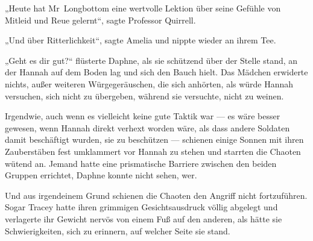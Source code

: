 \later

„Heute hat Mr~Longbottom eine wertvolle Lektion über seine Gefühle von Mitleid und Reue gelernt“, sagte Professor Quirrell.

„Und über Ritterlichkeit“, sagte Amelia und nippte wieder an ihrem Tee.

\later

„Geht es dir gut?“ flüsterte Daphne, als sie schützend über der Stelle stand, an der Hannah auf dem Boden lag und sich den Bauch hielt. Das Mädchen erwiderte nichts, außer weiteren Würgegeräuschen, die sich anhörten, als würde Hannah versuchen, sich nicht zu übergeben, während sie versuchte, nicht zu weinen.

Irgendwie, auch wenn es vielleicht keine gute Taktik war — es wäre besser gewesen, wenn Hannah direkt verhext worden wäre, als dass andere Soldaten damit beschäftigt wurden, sie zu beschützen — schienen einige Sonnen mit ihren Zauberstäben fest umklammert vor Hannah zu stehen und starrten die Chaoten wütend an. Jemand hatte eine prismatische Barriere zwischen den beiden Gruppen errichtet, Daphne konnte nicht sehen, wer.

Und aus irgendeinem Grund schienen die Chaoten den Angriff nicht fortzuführen. Sogar Tracey hatte ihren grimmigen Gesichtsausdruck völlig abgelegt und verlagerte ihr Gewicht nervös von einem Fuß auf den anderen, als hätte sie Schwierigkeiten, sich zu erinnern, auf welcher Seite sie stand.

